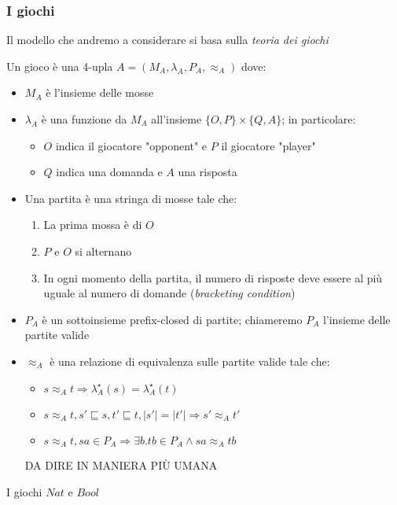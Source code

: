 \documentclass{beamer}
\begin{document}
\begin{frame}
	\frametitle{I giochi}
	
	Il modello che andremo a considerare si basa sulla \emph{teoria dei giochi}
	
	
	Un gioco è una 4-upla $A=( M_A , \lambda_A , P_A , \approx_A )$ dove:
	\begin{itemize}
	\item $M_A$ è l'insieme delle mosse
	\item $\lambda_A$ è una funzione da $M_A$ all'insieme $\{ O,P\} \times \{Q,A\}$; in particolare:
		\begin{itemize}
		\item $O$ indica il giocatore "opponent" e $P$ il giocatore "player"
		\item $Q$ indica una domanda e $A$ una risposta
		\end{itemize}
	\item Una partita è una stringa di mosse tale che:
		\begin{enumerate}
		\item La prima mossa è di $O$
		\item $P$ e $O$ si alternano
		\item In ogni momento della partita, il numero di risposte deve essere al più uguale al numero di domande (\emph{bracketing condition})
		\end{enumerate}
	\item $P_A$ è un sottoinsieme prefix-closed di partite; chiameremo $P_A$ l'insieme delle partite valide
	\end{itemize}
	
	
\end{frame}

\begin{frame}
	
	\begin{itemize}
	\item $\approx_A$ è una relazione di equivalenza sulle partite valide tale che:
		\begin{itemize}
		\item $s\approx_A t \Rightarrow \lambda^\star _A (s) = \lambda^\star _A (t) $
		\item $s\approx_A t , s' \sqsubseteq s , t' \sqsubseteq t, |s'| = |t'| \Rightarrow s' \approx_A t'$
		\item $s\approx_A t , sa\in P_A \Rightarrow \exists b . tb \in P_A \wedge sa \approx_A tb$
		\end{itemize}
	DA DIRE IN MANIERA PIÙ UMANA
	\end{itemize}
	
	\begin{example}
		I giochi $Nat$ e $Bool$
	\end{example}	
	
\end{frame}
\end{document}
